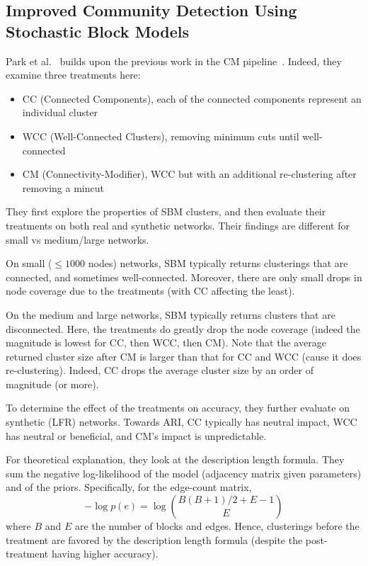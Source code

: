 \documentclass[../../main/main.tex]{subfiles}
\begin{document}
\subsection*{Improved Community Detection Using Stochastic Block Models}

Park et al.~\cite{park24-03} builds upon the previous work in the CM pipeline~\cite{park24-11}.
Indeed, they examine three treatments here:
\begin{itemize}
	\item CC (Connected Components), each of the connected components represent an individual cluster
	\item WCC (Well-Connected Clusters), removing minimum cuts until well-connected
	\item CM (Connectivity-Modifier), WCC but with an additional re-clustering after removing a mincut
\end{itemize}

They first explore the properties of SBM clusters, and then evaluate their treatments on both real and synthetic networks.
Their findings are different for small vs medium/large networks.

On small ($\le 1000$ nodes) networks, SBM typically returns clusterings that are connected, and sometimes well-connected.
Moreover, there are only small drops in node coverage due to the treatments (with CC affecting the least).

On the medium and large networks, SBM typically returns clusters that are disconnected.
Here, the treatments do greatly drop the node coverage (indeed the magnitude is lowest for CC, then WCC, then CM).
Note that the average returned cluster size after CM is larger than that for CC and WCC (cause it does re-clustering).
Indeed, CC drops the average cluster size by an order of magnitude (or more).

To determine the effect of the treatments on accuracy, they further evaluate on synthetic (LFR) networks.
Towards ARI, CC typically has neutral impact, WCC has neutral or beneficial, and CM's impact is unpredictable.

For theoretical explanation, they look at the description length formula.
They sum the negative log-likelihood of the model (adjacency matrix given parameters) and of the priors.
Specifically, for the edge-count matrix,
$$
	- \log p(e) = \log \binom{ B(B + 1)/2 + E - 1}{E}
$$
where $B$ and $E$ are the number of blocks and edges.
Hence, clusterings before the treatment are favored by the description length formula (despite the post-treatment having higher accuracy).

\bibsub
\end{document}
